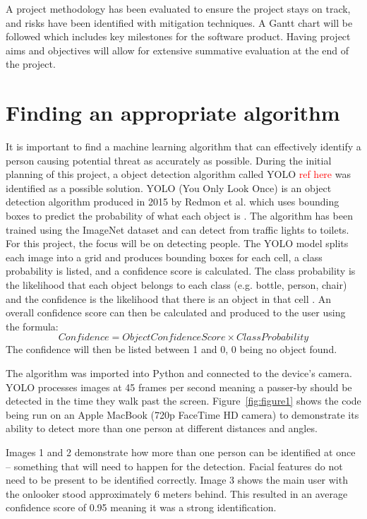 \documentclass[12pt]{article}
\theoremstyle{plain}
\theoremstyle{definition}
\begin{document}
A project methodology has been evaluated to ensure the project stays on track, and risks have been identified with mitigation techniques. A Gantt chart will be followed which includes key milestones for the software product. Having project aims and objectives will allow for extensive summative evaluation at the end of the project.


\section{Finding an appropriate algorithm}  
\label{sec:algorithm} 

It is important to find a machine learning algorithm that can effectively identify a person causing potential threat as accurately as possible.
During the initial planning of this project, a object detection algorithm called YOLO \textcolor{red}{ref here} was identified as a possible solution. 
YOLO (You Only Look Once) is an object detection algorithm produced in 2015 by Redmon et al. which uses bounding boxes to predict the probability of what each object is \cite{redmon_you_2016}. The algorithm has been trained using the ImageNet dataset \cite{noauthor_imagenet_nodate} and can detect from traffic lights to toilets. For this project, the focus will be on detecting people. The YOLO model splits each image into a grid and produces bounding boxes for each cell, a class probability is listed, and a confidence score is calculated. The class probability is the likelihood that each object belongs to each class (e.g. bottle, person, chair) and the confidence is the likelihood that there is an object in that cell \cite{redmon_you_2016}. An overall confidence score can then be calculated and produced to the user using the formula: 
\[
  Confidence = Object Confidence Score \times Class Probability
\]
The confidence will then be listed between 1 and 0, 0 being no object found.

The algorithm was imported into Python and connected to the device’s camera. YOLO processes images at 45 frames per second \cite{redmon_you_2016} meaning a passer-by should be detected in the time they walk past the screen. Figure~\ref{fig:figure1} shows the code being run on an Apple MacBook (720p FaceTime HD camera) to demonstrate its ability to detect more than one person at different distances and angles.

Images 1 and 2 demonstrate how more than one person can be identified at once – something that will need to happen for the detection. Facial features do not need to be present to be identified correctly. Image 3 shows the main user with the onlooker stood approximately 6 meters behind. This resulted in an average confidence score of 0.95 meaning it was a strong identification.
\end{document}
